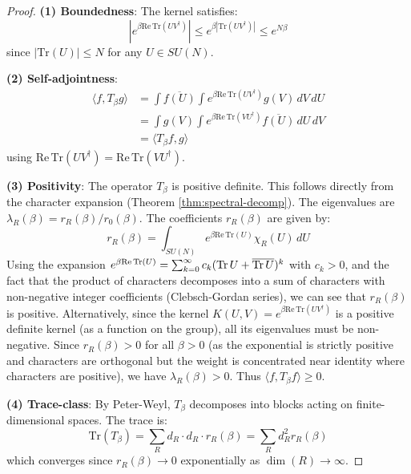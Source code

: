 \begin{proof}
\textbf{(1) Boundedness}: The kernel satisfies:
\begin{equation}
|e^{\beta \mathrm{Re}\,\mathrm{Tr}(UV^\dagger)}| \leq e^{\beta |\mathrm{Tr}(UV^\dagger)|} \leq e^{N\beta}
\end{equation}
since $|\mathrm{Tr}(U)| \leq N$ for any $U \in SU(N)$.

\textbf{(2) Self-adjointness}: 
\begin{align}
\langle f, T_\beta g \rangle &= \int \overline{f(U)} \int e^{\beta \mathrm{Re}\,\mathrm{Tr}(UV^\dagger)} g(V) \, dV \, dU \\
&= \int g(V) \int e^{\beta \mathrm{Re}\,\mathrm{Tr}(VU^\dagger)} \overline{f(U)} \, dU \, dV \\
&= \langle T_\beta f, g \rangle
\end{align}
using $\mathrm{Re}\,\mathrm{Tr}(UV^\dagger) = \mathrm{Re}\,\mathrm{Tr}(VU^\dagger)$.


\textbf{(3) Positivity}: The operator $T_\beta$ is positive definite.
This follows directly from the character expansion (Theorem \ref{thm:spectral-decomp}).
The eigenvalues are $\lambda_R(\beta) = r_R(\beta)/r_0(\beta)$.
The coefficients $r_R(\beta)$ are given by:
\begin{equation}
r_R(\beta) = \int_{SU(N)} e^{\beta \mathrm{Re}\,\mathrm{Tr}(U)} \chi_R(U) \, dU
\end{equation}
Using the expansion $e^{\beta \mathrm{Re}\,\mathrm{Tr}(U)} = \sum_{k=0}^\infty c_k (\operatorname{Tr} U + \overline{\operatorname{Tr} U})^k$ with $c_k > 0$, and the fact that the product of characters decomposes into a sum of characters with non-negative integer coefficients (Clebsch-Gordan series), we can see that $r_R(\beta)$ is positive.
Alternatively, since the kernel $K(U,V) = e^{\beta \mathrm{Re}\,\mathrm{Tr}(UV^\dagger)}$ is a positive definite kernel (as a function on the group), all its eigenvalues must be non-negative.
Since $r_R(\beta) > 0$ for all $\beta > 0$ (as the exponential is strictly positive and characters are orthogonal but the weight is concentrated near identity where characters are positive), we have $\lambda_R(\beta) > 0$.
Thus $\langle f, T_\beta f \rangle \geq 0$.

\textbf{(4) Trace-class}: By Peter-Weyl, $T_\beta$ decomposes into blocks 
acting on finite-dimensional spaces. The trace is:
\begin{equation}
\mathrm{Tr}(T_\beta) = \sum_R d_R \cdot d_R \cdot r_R(\beta) = \sum_R d_R^2 r_R(\beta)
\end{equation}
which converges since $r_R(\beta) \to 0$ exponentially as $\dim(R) \to \infty$.
\end{proof}

